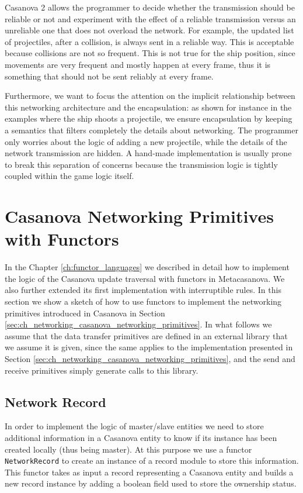 Casanova 2 allows the programmer to decide whether the transmission should be reliable or not and experiment with the effect of a reliable transmission versus an unreliable one that does not overload the network. For example, the updated list of projectiles, after a collision, is always sent in a reliable way. This is acceptable because collisions are not so frequent. This is not true for the ship position, since movements are very frequent and mostly happen at every frame, thus it is something that should not be sent reliably at every frame.

Furthermore, we want to focus the attention on the implicit relationship between this networking architecture and the encapsulation: as shown for instance in the examples where the ship shoots a projectile, we ensure encapsulation by keeping a semantics that filters completely the details about networking. The programmer only worries about the logic of adding a new projectile, while the details of the network transmission are hidden. A hand-made implementation is usually prone to break this separation of concerns because the transmission logic is tightly coupled within the game logic itself.

\section{Casanova Networking Primitives with Functors}
\label{sec:ch_networking_functor_networking}
In the Chapter \ref{ch:functor_languages} we described in detail how to implement the logic of the Casanova update traversal with functors in Metacasanova. We also further extended its first implementation with interruptible rules. In this section we show a sketch of how to use functors to implement the networking primitives introduced in Casanova in Section \ref{sec:ch_networking_casanova_networking_primitives}. In what follows we assume that the data transfer primitives are defined in an external library that we assume it is given, since the same applies to the implementation presented in Section \ref{sec:ch_networking_casanova_networking_primitives}, and the send and receive primitives simply generate calls to this library.

\subsection{Network Record}
\label{subsec:ch_networking_network_record}
In order to implement the logic of master/slave entities we need to store additional information in a Casanova entity to know if its instance has been created locally (thus being master). At this purpose we use a functor \texttt{NetworkRecord} to create an instance of a record module to store this information. This functor takes as input a record representing a Casanova entity and builds a new record instance by adding a boolean field used to store the ownership status.

